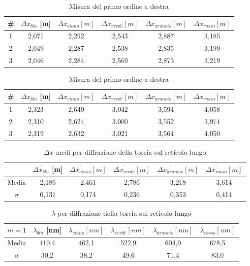 \documentclass{article}
\begin{document}
\begin{table}[h]
    \centering
    \begin{tabular}{||c|c|c|c|c|c||}
        \hline
        \# & \cellcolor{blue}$\Delta x_{blu}$ [m] & \cellcolor{cyan}$\Delta x_{ciano}[m]$ & \cellcolor{green}$\Delta x_{verde}[m]$ & \cellcolor{orange}$\Delta x_{arancio}[m]$ & \cellcolor{red}$\Delta x_{rosso}[m]$ \\
        \hline
        1 & 2,071 & 2,292 & 2,543 & 2,887 & 3,185 \\
        2 & 2,049 & 2,287 & 2,538 & 2,835 & 3,199 \\
        3 & 2,046 & 2,284 & 2,569 & 2,873 & 3,219 \\
        \hline
    \end{tabular}
    \caption{Misura del primo ordine a sinistra}
\centering
\begin{tabular}{||c|c|c|c|c|c||}
    \hline
    \# & \cellcolor{blue}$\Delta x_{blu}$ [m] & \cellcolor{cyan}$\Delta x_{ciano}[m]$ & \cellcolor{green}$\Delta x_{verde}[m]$ & \cellcolor{orange}$\Delta x_{arancio}[m]$ & \cellcolor{red}$\Delta x_{rosso}[m]$ \\
    \hline
    1 & 2,323 & 2,649 & 3,042 & 3,594 & 4,058 \\
    2 & 2,310 & 2,624 & 3,000 & 3,552 & 3,974 \\
    3 & 2,319 & 2,632 & 3,021 & 3,564 & 4,050 \\
    \hline
\end{tabular}
\caption{Misura del primo ordine a destra}
\end{table}

\begin{table}[h]
    \centering
\begin{tabular}{||c|c|c|c|c|c||}
    \hline
     & \cellcolor{blue}$\overline{\Delta x_{blu}}$ [m] & \cellcolor{cyan}$\overline{\Delta x_{ciano}} [m]$ & \cellcolor{green}$\overline{\Delta x_{verde}}[m]$ & \cellcolor{orange}$\overline{\Delta x_{arancio}}[m]$ & \cellcolor{red}$\overline{\Delta x_{rosso}}[m]$ \\
    \hline
    Media & 2,186 & 2,461 & 2,786 & 3,218 & 3,614 \\
    $\sigma$ & 0,131 & 0,174 & 0,236 & 0,353 & 0,414 \\
    \hline
\end{tabular}
\caption{$\Delta x$ medi per diffrazione della torcia sul reticolo lungo}
\end{table}

\begin{table}[h]
    \centering
\begin{tabular}{||c|c|c|c|c|c||}
    \hline
     $m = 1$ & \cellcolor{blue}$\lambda_{blu}$ [nm] & \cellcolor{cyan}$\lambda_{ciano} [nm]$ & \cellcolor{green}$\lambda_{verde}[nm]$ & \cellcolor{orange}$\lambda_{arancio}[nm]$ & \cellcolor{red}$\lambda_{rosso}[nm]$ \\
    \hline
    Media & 410,4 & 462,1 & 522,9 & 604,0 & 678,5 \\
    $\sigma$ & 30,2 & 38,2 & 49,6 & 71,4 & 83,0\\
    \hline
\end{tabular}
\caption{$\lambda$ per diffrazione della torcia sul reticolo lungo}
\end{table}
\end{document}
